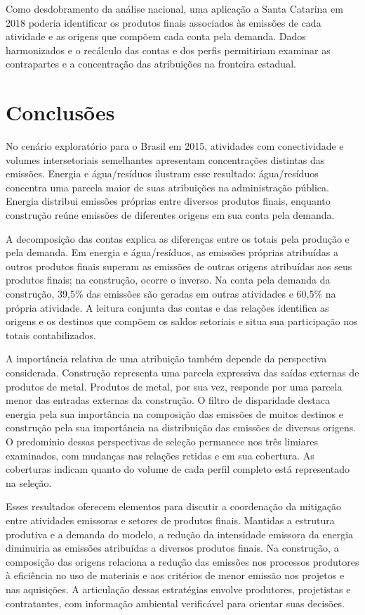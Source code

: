 \documentclass[11pt]{article}
\begin{document}
Como desdobramento da análise nacional, uma aplicação a Santa Catarina em 2018 poderia identificar os produtos finais associados às emissões de cada atividade e as origens que compõem cada conta pela demanda. Dados harmonizados e o recálculo das contas e dos perfis permitiriam examinar as contrapartes e a concentração das atribuições na fronteira estadual.

\section{Conclusões}

No cenário exploratório para o Brasil em 2015, atividades com conectividade e volumes intersetoriais semelhantes apresentam concentrações distintas das emissões. Energia e água/resíduos ilustram esse resultado: água/resíduos concentra uma parcela maior de suas atribuições na administração pública. Energia distribui emissões próprias entre diversos produtos finais, enquanto construção reúne emissões de diferentes origens em sua conta pela demanda.

A decomposição das contas explica as diferenças entre os totais pela produção e pela demanda. Em energia e água/resíduos, as emissões próprias atribuídas a outros produtos finais superam as emissões de outras origens atribuídas aos seus produtos finais; na construção, ocorre o inverso. Na conta pela demanda da construção, 39,5\% das emissões são geradas em outras atividades e 60,5\% na própria atividade. A leitura conjunta das contas e das relações identifica as origens e os destinos que compõem os saldos setoriais e situa sua participação nos totais contabilizados.

A importância relativa de uma atribuição também depende da perspectiva considerada. Construção representa uma parcela expressiva das saídas externas de produtos de metal. Produtos de metal, por sua vez, responde por uma parcela menor das entradas externas da construção. O filtro de disparidade destaca energia pela sua importância na composição das emissões de muitos destinos e construção pela sua importância na distribuição das emissões de diversas origens. O predomínio dessas perspectivas de seleção permanece nos três limiares examinados, com mudanças nas relações retidas e em sua cobertura. As coberturas indicam quanto do volume de cada perfil completo está representado na seleção.

Esses resultados oferecem elementos para discutir a coordenação da mitigação entre atividades emissoras e setores de produtos finais. Mantidas a estrutura produtiva e a demanda do modelo, a redução da intensidade emissora da energia diminuiria as emissões atribuídas a diversos produtos finais. Na construção, a composição das origens relaciona a redução das emissões nos processos produtores à eficiência no uso de materiais e aos critérios de menor emissão nos projetos e nas aquisições. A articulação dessas estratégias envolve produtores, projetistas e contratantes, com informação ambiental verificável para orientar suas decisões.
\end{document}
